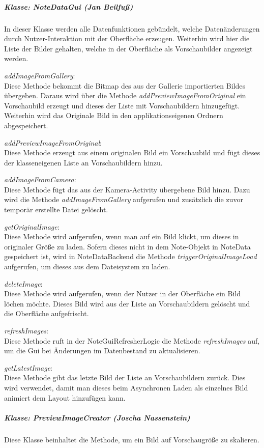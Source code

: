\subparagraph*{Klasse: NoteDataGui (Jan Beilfuß)}
In dieser Klasse werden alle Datenfunktionen gebündelt, welche Datenänderungen durch Nutzer-Interaktion mit der Oberfläche erzeugen. Weiterhin wird hier die Liste der Bilder gehalten, welche in der Oberfläche als Vorschaubilder angezeigt werden.

\textit{addImageFromGallery}:\\
Diese Methode bekommt die Bitmap des aus der Gallerie importierten Bildes übergeben. Daraus wird über die Methode \textit{addPreviewImageFromOriginal} ein Vorschaubild erzeugt und dieses der Liste mit Vorschaubildern hinzugefügt. Weiterhin wird das Originale Bild in den applikationseigenen Ordnern abgespeichert.

\textit{addPreviewImageFromOriginal}:\\
Diese Methode erzeugt aus einem originalen Bild ein Vorschaubild und fügt dieses der klasseneigenen Liste an Vorschaubildern hinzu.

\textit{addImageFromCamera}:\\
Diese Methode fügt das aus der Kamera-Activity übergebene Bild hinzu. Dazu wird die Methode \textit{addImageFromGallery} aufgerufen und zusätzlich die zuvor temporär erstellte Datei gelöscht.

\textit{getOriginalImage}:\\
Diese Methode wird aufgerufen, wenn man auf ein Bild klickt, um dieses in originaler Größe zu laden. Sofern dieses nicht in dem Note-Objekt in NoteData gespeichert ist, wird in NoteDataBackend die Methode \textit{triggerOriginalImageLoad} aufgerufen, um dieses aus dem Dateisystem zu laden.

\textit{deleteImage}:\\
Diese Methode wird aufgerufen, wenn der Nutzer in der Oberfläche ein Bild löchen möchte. Dieses Bild wird aus der Liste an Vorschaubildern gelöscht und die Oberfläche aufgefrischt.

\textit{refreshImages}:\\
Diese Methode ruft in der NoteGuiRefresherLogic die Methode \textit{refreshImages} auf, um die Gui bei Änderungen im Datenbestand zu aktualisieren.

\textit{getLatestImage}:\\
Diese Methode gibt das letzte Bild der Liste an Vorschaubildern zurück. Dies wird verwendet, damit man dieses beim Asynchronen Laden als einzelnes Bild animiert dem Layout hinzufügen kann.

\subparagraph*{Klasse: PreviewImageCreator (Joscha Nassenstein)}
Diese Klasse beinhaltet die Methode, um ein Bild auf Vorschaugröße zu skalieren.

